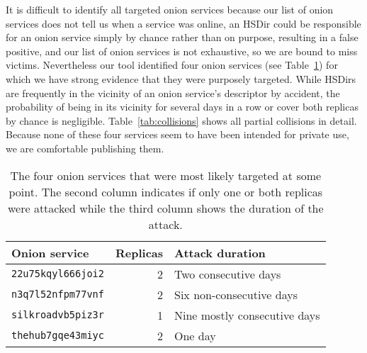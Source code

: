It is difficult to identify all targeted onion services because \first our list
of onion services does not tell us when a service was online, \second an HSDir
could be responsible for an onion service simply by chance rather than on
purpose, resulting in a false positive, and \third our list of onion services is
not exhaustive, so we are bound to miss victims.  Nevertheless our tool
identified four onion services (see Table~\ref{tab:targeted}) for which we have
strong evidence that they were purposely targeted.  While HSDirs are frequently
in the vicinity of an onion service's descriptor by accident, the probability of
being in its vicinity for several days in a row or cover both replicas by chance
is negligible.  Table~\ref{tab:collisions} shows all partial collisions in
detail.  Because none of these four services seem to have been intended for
private use, we are comfortable publishing them.

\begin{table}[t]
	\caption{The four onion services that were most likely targeted at some
	point.  The second column indicates if only one or both replicas were
	attacked while the third column shows the duration of the attack.}
	\label{tab:targeted}
	\centering
	\begin{tabular}{l r l}
	\toprule
	Onion service & Replicas & Attack duration \\
	\midrule
	\texttt{22u75kqyl666joi2} & 2 & Two consecutive days \\
	\texttt{n3q7l52nfpm77vnf} & 2 & Six non-consecutive days \\
	\texttt{silkroadvb5piz3r} & 1 & Nine mostly consecutive days \\
	\texttt{thehub7gqe43miyc} & 2 & One day \\
	\bottomrule
	\end{tabular}
\end{table}

